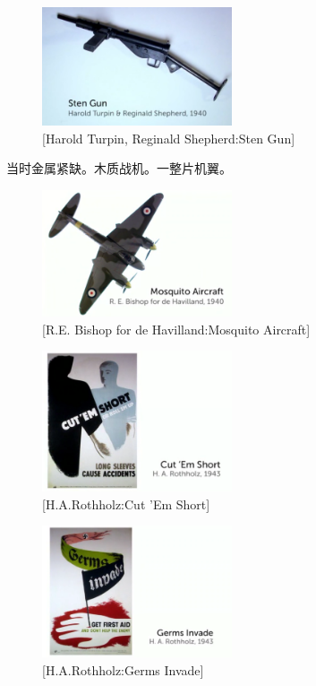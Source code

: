 \documentclass[UTF8]{../RepresentationUniverse}
\begin{document}
\begin{figure}[h]
    \centering
    \includegraphics[width=0.5\textwidth]{./src/figures/Sten Gun_2023-04-09_19-51-44.png}
    \caption{[Harold Turpin, Reginald Shepherd:Sten Gun]}
    \label{figure:Sten Gun}
\end{figure}



当时金属紧缺。木质战机。一整片机翼。
\begin{figure}[h]
    \centering
    \includegraphics[width=0.5\textwidth]{./src/figures/Mosquito Aircraft_2023-04-09_20-09-31.png}
    \caption{[R.E. Bishop for de Havilland:Mosquito Aircraft]}
    \label{figure:Mosquito Aircraft}
\end{figure}


\begin{figure}[h]
    \centering
    \includegraphics[width=0.5\textwidth]{./src/figures/Cut 'Em Short_2023-04-09_20-13-40.png}
    \caption{[H.A.Rothholz:Cut 'Em Short]}
    \label{figure:Cut 'Em Short}
\end{figure}


\begin{figure}[h]
    \centering
    \includegraphics[width=0.5\textwidth]{./src/figures/Germs Invade_2023-04-09_20-15-26.png}
    \caption{[H.A.Rothholz:Germs Invade]}
    \label{figure:Germs Invade}
\end{figure}
\end{document}
